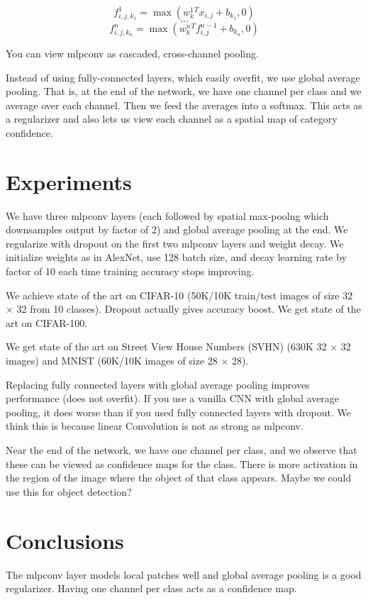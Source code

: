 \documentclass[a4paper]{article}
\begin{document}
\begin{equation}
  f_{i, j, k_1}^1 = \max(w_k^1^T x_{i, j} + b_{k_1}, 0)
\end{equation}
\begin{equation}
  ...
\end{equation}
\begin{equation}
  f_{i, j, k_n}^n = \max(w_k^n^T f_{i, j}^{n-1} + b_{k_n}, 0)
\end{equation}

You can view mlpconv as cascaded, cross-channel pooling.

Instead of using fully-connected layers, which easily overfit, we use global
average pooling. That is, at the end of the network, we have one channel per
class and we average over each channel. Then we feed the averages into a
softmax. This acts as a regularizer and also lets us view each channel as a
spatial map of category confidence.

\section{Experiments}
We have three mlpconv layers (each followed by spatial max-poolng which
downsamples output by factor of 2) and global average pooling at the end. We
regularize with dropout on the first two mlpconv layers and weight decay. We
initialize weights as in AlexNet, use 128 batch size, and decay learning rate by
factor of 10 each time training accuracy stops improving.

We achieve state of the art on CIFAR-10 (50K/10K train/test images of size
32 $\times$ 32 from 10 classes). Dropout actually gives accuracy boost. We get
state of the art on CIFAR-100.

We get state of the art on Street View House Numbers (SVHN) (630K 32 $\times$
32 images) and MNIST (60K/10K images of size 28 $\times$ 28).

Replacing fully connected layers with global average pooling improves
performance (does not overfit). If you use a vanilla CNN with global average
pooling, it does worse than if you used fully connected layers with dropout.
We think this is because linear Convolution is not as strong as mlpconv.

Near the end of the network, we have one channel per class, and we observe that
these can be viewed as confidence maps for the class. There is more activation
in the region of the image where the object of that class appears. Maybe we
could use this for object detection?

\section{Conclusions}
The mlpconv layer models local patches well and global average pooling is a
good regularizer. Having one channel per class acts as a confidence map.
\end{document}
